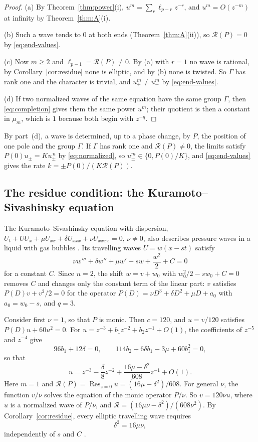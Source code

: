 \documentclass[11pt]{article}
\theoremstyle{definition}
\theoremstyle{remark}
\numberwithin{equation}{section}
\DeclareMathOperator{\Res}{Res}
\begin{document}
\begin{proof}
(a) By Theorem~\ref{thm:power}(i), \(u^m=\sum_r\ell_{p-r}z^{-r}\), and
\(u^m=O(z^{-m})\) at infinity by Theorem~\ref{thm:A}(i).

(b) Such a wave tends to \(0\) at both ends
(Theorem~\ref{thm:A}(ii)), so \(\mathcal R(P)=0\) by
\eqref{eq:end-values}.

(c) Now \(m\ge2\) and \(\ell_{p-1}=\mathcal R(P)\ne0\). By (a) with
\(r=1\) no wave is rational, by Corollary~\ref{cor:residue} none is
elliptic, and by (b) none is twisted. So \(\Gamma\) has rank one and
the character is trivial, and \(u_+^m\ne u_-^m\) by
\eqref{eq:end-values}.

(d) If two normalized waves of the same equation have the same group
\(\Gamma\), then \eqref{eq:completion} gives them the same power
\(u^m\); their quotient is then a constant in \(\mu_m\), which is \(1\)
because both begin with \(z^{-q}\).
\end{proof}

By part~(d), a wave is determined, up to a phase change, by \(P\), the
position of one pole and the group \(\Gamma\). If \(\Gamma\) has rank
one and \(\mathcal R(P)\ne0\), the limits satisfy
\(P(0)u_\pm=Ku_\pm^{\,n}\) by \eqref{eq:normalized}, so
\(u_\pm^m\in\{0,P(0)/K\}\), and \eqref{eq:end-values} gives the rate
\(k=\pm P(0)/(K\mathcal R(P))\).

\subsection{The residue condition: the Kuramoto--Sivashinsky equation}\label{sec:ks}\label{ex:ks}

The Kuramoto--Sivashinsky equation with dispersion,
\(U_t+UU_x+\mu U_{xx}+\delta U_{xxx}+\nu U_{xxxx}=0\), \(\nu\ne0\),
also describes pressure waves in a liquid with gas bubbles
\citep{KudryashovSinelshchikovFourthOrder2010}. Its travelling waves
\(U=w(x-st)\) satisfy
\[
 \nu w'''+\delta w''+\mu w'-sw+\frac{w^2}{2}+C=0
\]
for a constant \(C\). Since \(n=2\), the shift \(w=v+w_0\) with
\(w_0^2/2-sw_0+C=0\) removes \(C\) and changes only the constant
term of the linear part: \(v\) satisfies \(P(D)v+v^2/2=0\) for the operator
\(P(D)=\nu D^3+\delta D^2+\mu D+a_0\) with \(a_0=w_0-s\), and \(q=3\).

Consider first \(\nu=1\), so that \(P\) is monic. Then \(c=120\), and
\(u=v/120\) satisfies \(P(D)u+60u^2=0\). For
\(u=z^{-3}+b_1z^{-2}+b_2z^{-1}+O(1)\), the coefficients of \(z^{-5}\)
and \(z^{-4}\) give
\[
 96b_1+12\delta=0,\qquad 114b_2+6\delta b_1-3\mu+60b_1^2=0,
\]
so that
\[
 u=z^{-3}-\frac{\delta}{8}z^{-2}+\frac{16\mu-\delta^2}{608}z^{-1}+O(1).
\]
Here \(m=1\) and \(\mathcal R(P)=\Res_{z=0}u=(16\mu-\delta^2)/608\).
For general \(\nu\), the function \(v/\nu\) solves the equation of the
monic operator \(P/\nu\). So \(v=120\nu u\), where \(u\) is a normalized
wave of \(P/\nu\), and
\(\mathcal R=(16\mu\nu-\delta^2)/(608\nu^2)\). By
Corollary~\ref{cor:residue}, every elliptic travelling wave requires
\[
 \delta^2=16\mu\nu,
\]
independently of \(s\) and \(C\)
\citep[Eq.~(3) and Theorem~1(i)]{Eremenko2006}.
\end{document}
